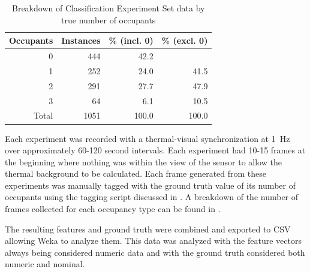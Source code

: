 \documentclass[../thesis/thesis.tex]{subfiles}
\begin{document}
\begin{table}
\centering
\begin{tabular}{|r|r|r|r|}
\hline
\textbf{Occupants} & \textbf{Instances} & \textbf{\% (incl. 0)} & \textbf{\% (excl. 0)} \\ \hline
0                  & 444                & 42.2                  &                       \\ \hline
1                  & 252                & 24.0                  & 41.5                  \\ \hline
2                  & 291                & 27.7                  & 47.9                  \\ \hline
3                  & 64                 & 6.1                   & 10.5                  \\ \hline
Total              & 1051               & 100.0                 & 100.0                 \\ \hline
\end{tabular}
\caption{Breakdown of Classification Experiment Set data by true number of occupants}
\label{tab:expbreak}
\end{table}

Each experiment was recorded with a thermal-visual synchronization at 1~Hz over approximately 60-120 second intervals. Each experiment had 10-15 frames at the beginning where nothing was within the view of the sensor to allow the thermal background to be calculated. Each frame generated from these experiments was manually tagged with the ground truth value of its number of occupants using the tagging script discussed in . A breakdown of the number of frames collected for each occupancy type can be found in .

The resulting features and ground truth were combined and exported to CSV allowing Weka to analyze them. This data was analyzed with the feature vectors always being considered numeric data and with the ground truth considered both numeric and nominal.
\end{document}
